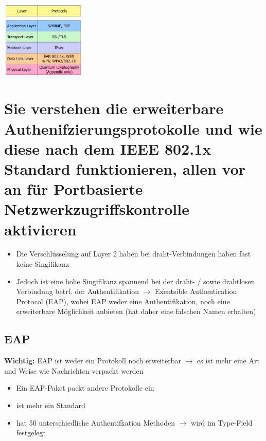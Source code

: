 \documentclass{report}
\newenvironment{Figure}
	{\par\medskip\noindent\minipage{\linewidth}}
	{\endminipage\par\medskip}
\theoremstyle{definition}
\theoremstyle{example}
\begin{document}
\begin{Figure}
\centering
\includegraphics[width=150px]{img/ProtocolPerLayer.png}
	\label{fig:Überblick über die verschiedenen Protokollen pro Layer}
\end{Figure}


\section{Sie verstehen die erweiterbare Authenifzierungsprotokolle und wie diese nach dem IEEE 802.1x Standard funktionieren, allen vor an für Portbasierte Netzwerkzugriffskontrolle aktivieren}
\begin{itemize}
	\item Die Verschlüsselung auf Layer 2 haben bei draht-Verbindungen haben fast keine Singifikanz
	\item Jedoch ist eine hohe Singifikanz spannend bei der draht- / sowie drahtlosen Verbindung betrf. der Authentifikation $\rightarrow$ Exentsible Authentication Protocol (EAP), wobei EAP weder eine Authentifikation, noch eine erweiterbare Möglichkeit anbieten (hat daher eine falschen Namen erhalten)
\end{itemize}

	\subsection{EAP}
\textbf{Wichtig:} EAP ist weder ein Protokoll noch erweiterbar $\rightarrow$ es ist mehr eine Art und Weise wie Nachrichten verpackt werden
\begin{itemize}
	\item Ein EAP-Paket packt andere Protokolle ein
	\item ist mehr ein Standard
	\item hat 50 unterschiedliche Authentifkation Methoden $\rightarrow$ wird im Type-Field festgelegt
\end{itemize}
\end{document}
